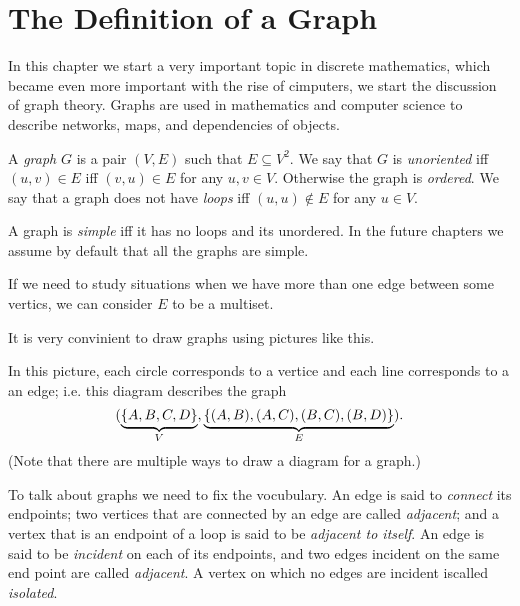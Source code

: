 \chapter{The Definition of a Graph}
In this chapter we start a very important topic in discrete mathematics, which
became even more important with the rise of cimputers, we start the discussion
of graph theory. Graphs are used in mathematics and computer science to describe
networks, maps, and dependencies of objects.

\begin{definition}
  A \emph{graph} $G$ is a pair $(V, E)$ such that $E \subseteq V^2$.
  We say that $G$ is \emph{unoriented} iff $(u, v) \in E$ iff $(v, u) \in E$ for
  any $u, v \in V$. Otherwise the graph is \emph{ordered}.
  We say that a graph does not have \emph{loops} iff $(u, u) \notin E$ for any
  $u \in V$.
\end{definition}
A graph is \emph{simple} iff it has no loops and its unordered. In the future
chapters we assume by default that all the graphs are simple.

\begin{remark}
  If we need to study situations when we have more than one edge between some
  vertics, we can consider $E$ to be a multiset.
\end{remark}

It is very convinient to draw graphs using pictures like this.
\begin{center}
\end{center}
In this picture, each circle corresponds to a vertice and each line corresponds
to a an edge; i.e. this diagram describes the graph
\[
  (\underbrace{\set{A, B, C, D}}_V,
  \underbrace{\set{(A, B), (A, C), (B, C), (B, D)}}_E).
\]
(Note that there are multiple ways to draw a diagram for a graph.)

To talk about graphs we need to fix the vocubulary.
An edge is said to \emph{connect} its endpoints; two vertices that are
connected by an edge are called \emph{adjacent}; and a vertex that is an
endpoint of a loop is said to be \emph{adjacent to itself}. An edge is said to
be \emph{incident} on each of its endpoints, and two edges incident
on the same end point are called \emph{adjacent}. A vertex on which no edges
are incident iscalled \emph{isolated}.


